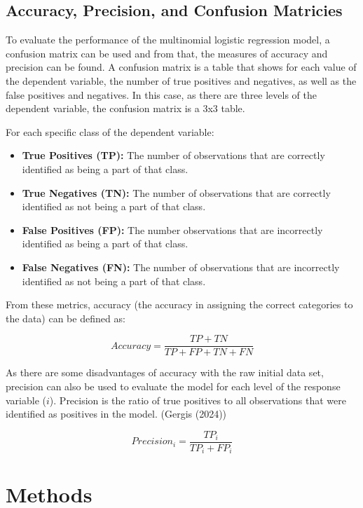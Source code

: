 \documentclass[
  letterpaper,
  DIV=11,
  numbers=noendperiod]{scrartcl}
\providecommand{\tightlist}{%
  \setlength{\itemsep}{0pt}\setlength{\parskip}{0pt}}\usepackage{longtable,booktabs,array}
\begin{document}
\subsection{Accuracy, Precision, and Confusion
Matricies}\label{accuracy-precision-and-confusion-matricies}

To evaluate the performance of the multinomial logistic regression
model, a confusion matrix can be used and from that, the measures of
accuracy and precision can be found. A confusion matrix is a table that
shows for each value of the dependent variable, the number of true
positives and negatives, as well as the false positives and negatives.
In this case, as there are three levels of the dependent variable, the
confusion matrix is a 3x3 table.

For each specific class of the dependent variable:

\begin{itemize}
\tightlist
\item
  \textbf{True Positives (TP):} The number of observations that are
  correctly identified as being a part of that class.
\item
  \textbf{True Negatives (TN):} The number of observations that are
  correctly identified as not being a part of that class.
\item
  \textbf{False Positives (FP):} The number observations that are
  incorrectly identified as being a part of that class.
\item
  \textbf{False Negatives (FN):} The number of observations that are
  incorrectly identified as not being a part of that class.
\end{itemize}

From these metrics, accuracy (the accuracy in assigning the correct
categories to the data) can be defined as:

\[ Accuracy = \frac{TP + TN}{TP + FP + TN + FN}\]

As there are some disadvantages of accuracy with the raw initial data
set, precision can also be used to evaluate the model for each level of
the response variable (\(i\)). Precision is the ratio of true positives
to all observations that were identified as positives in the model.
(Gergis (2024))

\[Precision_i = \frac{TP_i}{TP_i + FP_i}\]

\section{Methods}\label{methods}
\end{document}
